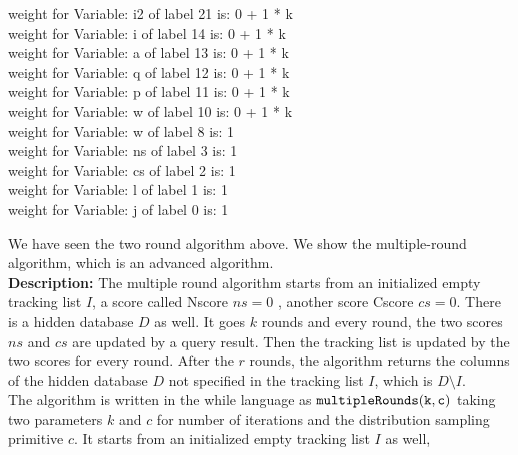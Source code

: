 \begin{example}
weight for Variable: i2 of label 21 is: 0 + 1 * k \\
weight for Variable: i of label 14 is: 0 + 1 * k \\
weight for Variable: a of label 13 is: 0 + 1 * k \\
weight for Variable: q of label 12 is: 0 + 1 * k \\
weight for Variable: p of label 11 is: 0 + 1 * k \\
weight for Variable: w of label 10 is: 0 + 1 * k \\
weight for Variable: w of label 8 is: 1 \\
weight for Variable: ns of label 3 is: 1 \\
weight for Variable: cs of label 2 is: 1 \\
weight for Variable: l of label 1 is: 1 \\
weight for Variable: j of label 0 is: 1 \\
%
\end{example}
  We have seen the two round algorithm above. We show the multiple-round algorithm, which is an advanced algorithm.
 \\
\textbf{Description:}
The multiple round algorithm starts from an initialized empty tracking list $I$, a score called Nscore $ns=0$ , another score Cscore $cs=0$.
There is a hidden database $D$ as well.
It goes $k$ rounds and every round, the two scores $ns$ and $cs$ are updated by a query result. 
Then the tracking list is updated by the two scores for every round.  
After the $r$ rounds, the algorithm returns the columns of the hidden database $D$ not specified in the tracking list $I$, which is $D \setminus I$. 
\\
The algorithm is written in the while language as $\mathtt{multipleRounds(k, c)} $ taking two parameters $k$ and $c$ for 
number of iterations and the distribution sampling primitive $c$.
It starts from an initialized empty tracking list $I$ as well,
